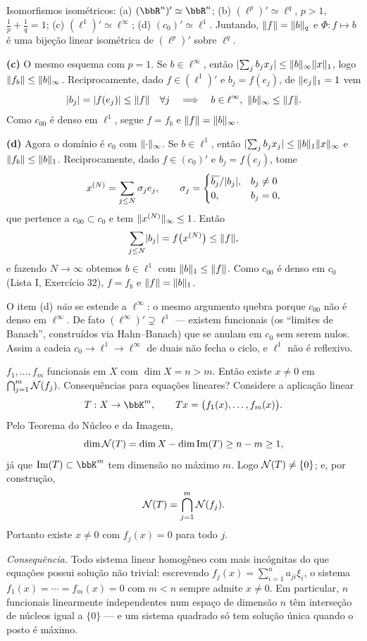 \begin{exercicio}{Isomorfismos isométricos: (a) $(\R^n)'\simeq\R^n$; (b) $(\ell^p)'\simeq \ell^q$, $p>1$, $\frac1p+\frac1q=1$; (c) $(\ell^1)'\simeq \ell^\infty$; (d) $(c_0)'\simeq \ell^1$.}
Juntando, $\lVert f\rVert=\lVert b\rVert_q$ e $\Phi:f\mapsto b$ é uma bijeção linear isométrica de $(\ell^p)'$ sobre $\ell^q$.

\textbf{(c)} O mesmo esquema com $p=1$. Se $b\in \ell^\infty$, então $\lvert\sum_jb_jx_j\rvert\le\lVert b\rVert_\infty\lVert x\rVert_1$, logo $\lVert f_b\rVert\le\lVert b\rVert_\infty$. Reciprocamente, dado $f\in(\ell^1)'$ e $b_j=f(e_j)$, de $\lVert e_j\rVert_1=1$ vem
\[ \abs{b_j}=\abs{f(e_j)}\le\norm{f}\quad\forall j\quad\Longrightarrow\quad b\in \ell^\infty,\ \norm{b}_\infty\le\norm{f}. \]
Como $c_{00}$ é denso em $\ell^1$, segue $f=f_b$ e $\lVert f\rVert=\lVert b\rVert_\infty$.

\textbf{(d)} Agora o domínio é $c_0$ com $\lVert\cdot\rVert_\infty$. Se $b\in \ell^1$, então $\lvert\sum_jb_jx_j\rvert\le\lVert b\rVert_1\lVert x\rVert_\infty$ e $\lVert f_b\rVert\le\lVert b\rVert_1$. Reciprocamente, dado $f\in(c_0)'$ e $b_j=f(e_j)$, tome
\[ x^{(N)}=\sum_{j\le N}\sigma_je_j,\qquad \sigma_j=\begin{cases}\overline{b_j}/\lvert b_j\rvert,& b_j\neq0\\ 0,& b_j=0,\end{cases} \]
que pertence a $c_{00}\subset c_0$ e tem $\lVert x^{(N)}\rVert_\infty\le1$. Então
\[ \sum_{j\le N}\lvert b_j\rvert=f\bigl(x^{(N)}\bigr)\le\lVert f\rVert, \]
e fazendo $N\to\infty$ obtemos $b\in \ell^1$ com $\lVert b\rVert_1\le\lVert f\rVert$. Como $c_{00}$ é denso em $c_0$ (Lista I, Exercício 32), $f=f_b$ e $\lVert f\rVert=\lVert b\rVert_1$.

\begin{obs}
O item (d) \emph{não} se estende a $\ell^\infty$: o mesmo argumento quebra porque $c_{00}$ não é denso em $\ell^\infty$. De fato $(\ell^\infty)'\supsetneq \ell^1$ --- existem funcionais (os ``limites de Banach'', construídos via Hahn--Banach) que se anulam em $c_0$ sem serem nulos. Assim a cadeia $c_0\to \ell^1\to \ell^\infty$ de duais não fecha o ciclo, e $\ell^1$ não é reflexivo.
\end{obs}
\end{exercicio}

\begin{exercicio}{$f_1,\dots,f_m$ funcionais em $X$ com $\dim X=n>m$. Então existe $x\neq0$ em $\bigcap_{j=1}^m\mathcal{N}(f_j)$. Consequências para equações lineares?}
\sol
Considere a aplicação linear
\[ T:X\to\K^m,\qquad Tx=\bigl(f_1(x),\dots,f_m(x)\bigr). \]
Pelo Teorema do Núcleo e da Imagem,
\[ \dim\mathcal{N}(T)=\dim X-\dim\operatorname{Im}(T)\ge n-m\ge1, \]
já que $\Ima(T)\subset\K^m$ tem dimensão no máximo $m$. Logo $\mathcal{N}(T)\neq\{0\}$; e, por construção,
\[ \mathcal{N}(T)=\bigcap_{j=1}^{m}\mathcal{N}(f_j). \]
Portanto existe $x\neq0$ com $f_j(x)=0$ para todo $j$.

\emph{Consequência.} Todo sistema linear homogêneo com mais incógnitas do que equações possui solução não trivial: escrevendo $f_j(x)=\sum_{i=1}^{n}a_{ji}\xi_i$, o sistema $f_1(x)=\cdots=f_m(x)=0$ com $m<n$ sempre admite $x\neq0$. Em particular, $n$ funcionais linearmente independentes num espaço de dimensão $n$ têm interseção de núcleos igual a $\{0\}$ --- e um sistema quadrado só tem solução única quando o posto é máximo.
\end{exercicio}

